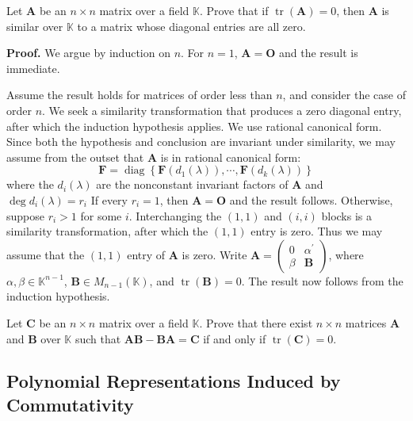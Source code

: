 \documentclass[12pt, a4paper, oneside]{book}
\begin{document}
\begin{question}
    Let $\mathbf{A}$ be an $n \times n$ matrix over a field $\mathbb{K}$. Prove that if $\operatorname{tr}(\mathbf{A})=0$, then $\mathbf{A}$ is similar over $\mathbb{K}$ to a matrix whose diagonal entries are all zero.

    \textbf{Proof.} We argue by induction on $n$. For $n=1$, $\mathbf{A}=\mathbf{O}$ and the result is immediate.

    Assume the result holds for matrices of order less than $n$, and consider the case of order $n$. We seek a similarity transformation that produces a zero diagonal entry, after which the induction hypothesis applies. We use rational canonical form. Since both the hypothesis and conclusion are invariant under similarity, we may assume from the outset that $\mathbf{A}$ is in rational canonical form:
    \[
        \mathbf{F}=\operatorname{diag}\left\{\mathbf{F}\left(d_1(\lambda)\right), \cdots, \mathbf{F}\left(d_k(\lambda)\right)\right\}
    \]
    where the $d_i(\lambda)$ are the nonconstant invariant factors of $\mathbf{A}$ and
    $\operatorname{deg} d_i(\lambda)=r_i$
    If every $r_i=1$, then $\mathbf{A}=\mathbf{O}$ and the result follows. Otherwise, suppose $r_i>1$ for some $i$. Interchanging the $(1,1)$ and $(i,i)$ blocks is a similarity transformation, after which the $(1,1)$ entry is zero. Thus we may assume that the $(1,1)$ entry of $\mathbf{A}$ is zero. Write $\mathbf{A}=\left(\begin{array}{cc}0 & {\alpha}^{\prime} \\ {\beta} & \mathbf{B}\end{array}\right)$, where ${\alpha}, {\beta} \in \mathbb{K}^{n-1}$, $\mathbf{B} \in M_{n-1}(\mathbb{K})$, and $\operatorname{tr}(\mathbf{B})=0$. The result now follows from the induction hypothesis.
\end{question}

\begin{corollary}
    Let $\mathbf{C}$ be an $n \times n$ matrix over a field $\mathbb{K}$. Prove that there exist $n \times n$ matrices $\mathbf{A}$ and $\mathbf{B}$ over $\mathbb{K}$ such that ${\mathbf{A} \mathbf{B}}-\mathbf{B} \mathbf{A}=\mathbf{C}$ if and only if $\operatorname{tr}(\mathbf{C})=0$.
\end{corollary}
\subsection{Polynomial Representations Induced by Commutativity}
\end{document}
